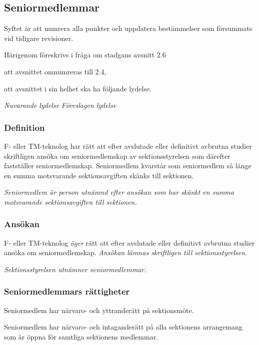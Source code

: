 \documentclass{article}
\newenvironment{lydelse}
    {\begin{paracol}{2}%
        \emph{Nuvarande lydelse}%
        \switchcolumn%
        \emph{Föreslagen lydelse}%
    \end{paracol}%
    \begin{enumerate}[label=\thesubsection.\arabic*]%
    \begin{paracol}{2}%
    }{\end{paracol}\end{enumerate}}
\newcommand{\itemb}{\item[\textbullet]}
\begin{document}
\subsection{Seniormedlemmar}
Syftet är att numrera alla punkter och uppdatera bestämmelser som försummats vid tidigare revisioner.

Härigenom föreskrivs i fråga om stadgans avsnitt 2.6
\begin{dels}
    \item att avsnittet omnumreras till 2.4,
    \item att avsnittet i sin helhet ska ha följande lydelse.
\end{dels}

\begin{lydelse}%
    \subsubsection*{Definition}
    \itemb F- eller TM-teknolog har rätt att efter avslutade eller definitivt
  avbrutna studier skriftligen ansöka om seniormedlemskap av sektionsstyrelsen
  som därefter fastställer seniormedlemskap. Seniormedlem kvarstår som
  senior\-med\-lem så länge en summa motsvarande sektionsavgiften skänks till sektionen.

\switchcolumn
    \setcounter{enumi}{0}
    \item \emph{Seniormedlem är person utnämnd efter ansökan som har skänkt en summa motsvarande sektionsavgiften till sektionen.}
    
    \subsubsection*{Ansökan}
  
    \item F- eller TM-teknolog \emph{äger} rätt att efter avslutade eller definitivt
  avbrutna studier ansöka om seniormedlemskap.
  \emph{Ansökan lämnas skriftligen till sektionsstyrelsen.}
  
    \item \emph{Sektionsstyrelsen utnämner seniormedlemmar.}
    
\switchcolumn*
    \subsubsection*{Seniormedlemmars rättigheter}%
    \itemb Seniormedlem har närvaro- och yttranderätt på sektionsmöte.

  \itemb Seniormedlem har närvaro- och intaganderätt på alla
   sektionens arrangemang som är öppna för samtliga sektionens
   medlemmar.


\end{lydelse}
\end{document}
